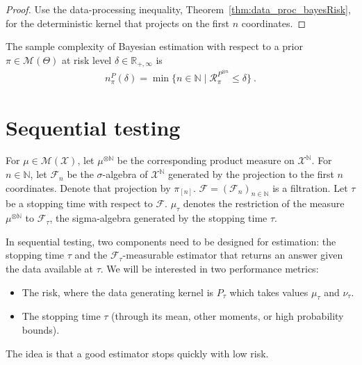 \begin{proof}%
{}
Use the data-processing inequality, Theorem~\ref{thm:data_proc_bayesRisk}, for the deterministic kernel that projects on the first $n$ coordinates.
\end{proof}


\begin{definition}
  \label{def:priorSampleComplexity}
  The sample complexity of Bayesian estimation with respect to a prior $\pi \in \mathcal M(\Theta)$ at risk level $\delta \in \mathbb{R}_{+,\infty}$ is
  \begin{align*}
  n_\pi^P(\delta) = \min \{n \in \mathbb{N} \mid \mathcal R_\pi^{P^{\otimes n}} \le \delta\} \: .
  \end{align*}
\end{definition}


\section{Sequential testing}

For $\mu \in \mathcal M(\mathcal X)$, let $\mu^{\otimes \mathbb{N}}$ be the corresponding product measure on $\mathcal X^{\mathbb{N}}$.
For $n \in \mathbb{N}$, let $\mathcal F_n$ be the $\sigma$-algebra of $\mathcal X^{\mathbb{N}}$ generated by the projection to the first $n$ coordinates. Denote that projection by $\pi_{[n]}$.
$\mathcal F = (\mathcal F_n)_{n \in \mathbb{N}}$ is a filtration.
Let $\tau$ be a stopping time with respect to $\mathcal F$. $\mu_\tau$ denotes the restriction of the measure $\mu^{\otimes \mathbb{N}}$ to $\mathcal F_\tau$, the sigma-algebra generated by the stopping time $\tau$.

In sequential testing, two components need to be designed for estimation: the stopping time $\tau$ and the $\mathcal F_\tau$-measurable estimator that returns an answer given the data available at $\tau$.
We will be interested in two performance metrics:
\begin{itemize}
  \item The risk, where the data generating kernel is $P_\tau$ which takes values $\mu_\tau$ and $\nu_\tau$.
  \item The stopping time $\tau$ (through its mean, other moments, or high probability bounds).
\end{itemize}
The idea is that a good estimator stops quickly with low risk.


